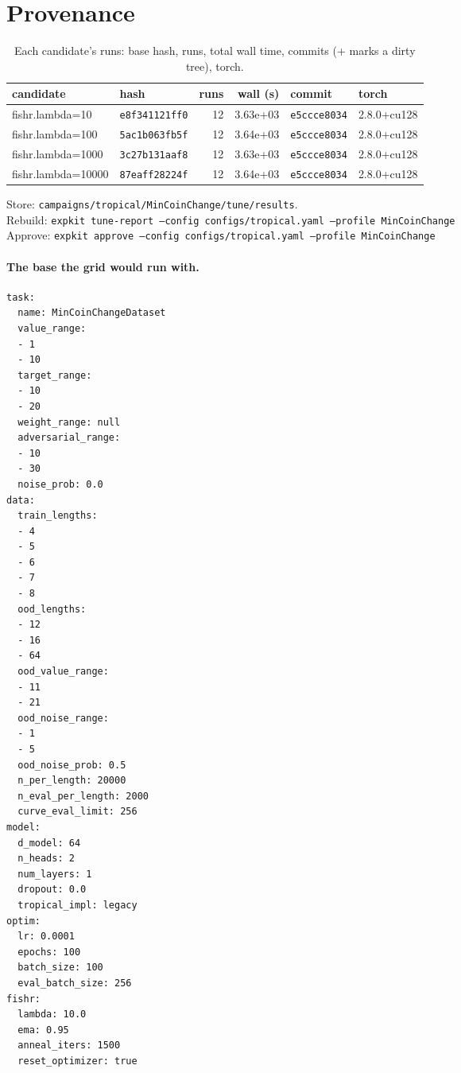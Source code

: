 \documentclass[10pt]{article}
\begin{document}
\section{Provenance}
{\small
\begin{longtable}{llrrll}
\caption{Each candidate's runs: base hash, runs, total wall time, commits (+ marks a dirty tree), torch.}\label{tab:provenance}\\
\toprule
candidate & hash & runs & wall (s) & commit & torch\\
\midrule
\endhead
fishr.lambda=10 & \texttt{e8f341121ff0} & 12 & 3.63e+03 & \texttt{e5ccce8034} & 2.8.0+cu128\\
fishr.lambda=100 & \texttt{5ac1b063fb5f} & 12 & 3.64e+03 & \texttt{e5ccce8034} & 2.8.0+cu128\\
fishr.lambda=1000 & \texttt{3c27b131aaf8} & 12 & 3.63e+03 & \texttt{e5ccce8034} & 2.8.0+cu128\\
fishr.lambda=10000 & \texttt{87eaff28224f} & 12 & 3.64e+03 & \texttt{e5ccce8034} & 2.8.0+cu128\\
\bottomrule
\end{longtable}
}
\noindent Store: \texttt{campaigns/tropical/MinCoinChange/tune/results}.\\
Rebuild: \texttt{expkit tune-report --config configs/tropical.yaml --profile MinCoinChange}\\
Approve: \texttt{expkit approve --config configs/tropical.yaml --profile MinCoinChange}

\paragraph{The base the grid would run with.}
{\footnotesize
\begin{verbatim}
task:
  name: MinCoinChangeDataset
  value_range:
  - 1
  - 10
  target_range:
  - 10
  - 20
  weight_range: null
  adversarial_range:
  - 10
  - 30
  noise_prob: 0.0
data:
  train_lengths:
  - 4
  - 5
  - 6
  - 7
  - 8
  ood_lengths:
  - 12
  - 16
  - 64
  ood_value_range:
  - 11
  - 21
  ood_noise_range:
  - 1
  - 5
  ood_noise_prob: 0.5
  n_per_length: 20000
  n_eval_per_length: 2000
  curve_eval_limit: 256
model:
  d_model: 64
  n_heads: 2
  num_layers: 1
  dropout: 0.0
  tropical_impl: legacy
optim:
  lr: 0.0001
  epochs: 100
  batch_size: 100
  eval_batch_size: 256
fishr:
  lambda: 10.0
  ema: 0.95
  anneal_iters: 1500
  reset_optimizer: true
\end{verbatim}
}

\clearpage
\appendix
\end{document}
